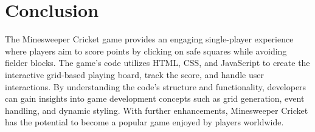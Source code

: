 \documentclass{article}
\begin{document}
\section{Conclusion}

The Minesweeper Cricket game provides an engaging single-player experience where players aim to score points by clicking on safe squares while avoiding fielder blocks. The game's code utilizes HTML, CSS, and JavaScript to create the interactive grid-based playing board, track the score, and handle user interactions. By understanding the code's structure and functionality, developers can gain insights into game development concepts such as grid generation, event handling, and dynamic styling. With further enhancements, Minesweeper Cricket has the potential to become a popular game enjoyed by players worldwide.



\end{document}
